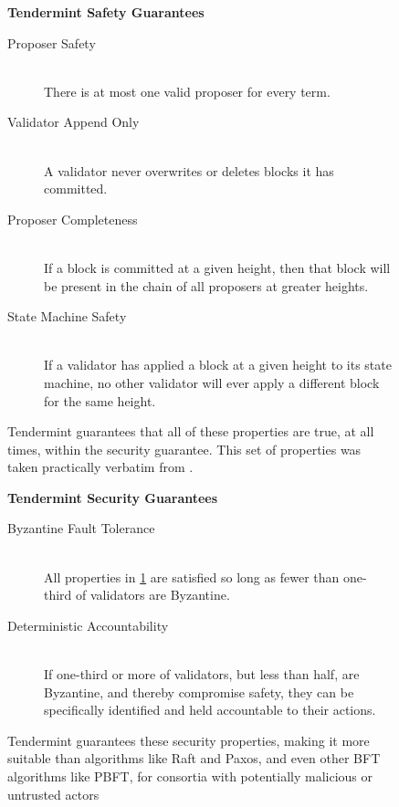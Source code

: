 \begin{figure}[]
	\textbf{Tendermint Safety Guarantees}
	\begin{description}
	  \item[Proposer Safety] \hfill \\
		There is at most one valid proposer for every term.
	  \item[Validator Append Only] \hfill \\
		A validator never overwrites or deletes blocks it has committed.
	  \item[Proposer Completeness] \hfill \\
		If a block is committed at a given height, then that block will be present in the chain of all proposers at greater heights.
	  \item[State Machine Safety] \hfill \\
		If a validator has applied a block at a given height to its state machine, no other validator will ever apply a different block for the same height.
	\end{description}
  	\caption[Tendermint Safety Guarantees]{Tendermint guarantees that all of these properties are true, at all times, within the security guarantee. This set of properties was taken practically verbatim from \cite{raft_thesis}.}
	\label{fig:tendermint_guarantees}
\end{figure}

\begin{figure}[]
	\textbf{Tendermint Security Guarantees}
	\begin{description}
	  \item[Byzantine Fault Tolerance] \hfill \\
		All properties in \ref{fig:tendermint_guarantees} are satisfied so long as fewer than one-third of validators are Byzantine.
	  \item[Deterministic Accountability] \hfill \\
		If one-third or more of validators, but less than half, are Byzantine, and thereby compromise safety, 
		they can be specifically identified and held accountable to their actions.
	\end{description}
  	\caption[Tendermint Security Guarantees]{Tendermint guarantees these security properties, making it more suitable than algorithms like Raft and Paxos, and even other BFT algorithms like PBFT, for consortia with potentially malicious or untrusted actors}
	\label{fig:tendermint_security}
\end{figure}


